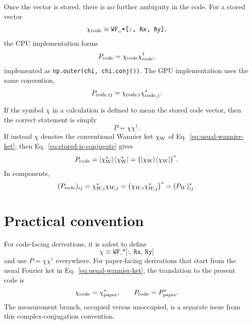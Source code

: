 \documentclass[aps,prb,onecolumn,nofootinbib,superscriptaddress]{revtex4-2}
\newcommand{\chiC}{\chi_{\rm code}}
\newcommand{\chiW}{\chi_{\rm W}}
\begin{document}
Once the vector is stored, there is no further ambiguity in the code.  For a
stored vector
\begin{equation}
    \chiC \equiv \texttt{WF\_*[:, Rx, Ry]},
\end{equation}
the CPU implementation forms
\begin{equation}
    P_{\rm code}
    =
    \chiC\chiC^\dagger ,
    \label{eq:code-projector}
\end{equation}
implemented as \texttt{np.outer(chi, chi.conj())}.  The GPU implementation uses
the same convention,
\begin{equation}
    P_{{\rm code},ij}
    =
    \chi_{{\rm code},i}\chi_{{\rm code},j}^* .
\end{equation}

If the symbol $\chi$ in a calculation is defined to mean the stored code vector,
then the correct statement is simply
\begin{equation}
    P = \chi\chi^\dagger .
\end{equation}
If instead $\chi$ denotes the conventional Wannier ket
$\chiW$ of Eq.~\eqref{eq:usual-wannier-ket}, then
Eq.~\eqref{eq:stored-is-conjugate} gives
\begin{equation}
    P_{\rm code}
    =
    |\chiW^*\rangle\langle \chiW^*|
    =
    \bigl(|\chiW\rangle\langle\chiW|\bigr)^* .
    \label{eq:projector-conjugate}
\end{equation}
In components,
\begin{equation}
    (P_{\rm code})_{ij}
    =
    \chi_{W,i}^*\chi_{W,j}
    =
    \left(\chi_{W,i}\chi_{W,j}^*\right)^*
    =
    (P_W)_{ij}^* .
\end{equation}

\section{Practical convention}

For code-facing derivations, it is safest to define
\begin{equation}
    \chi \equiv \texttt{WF\_*[:, Rx, Ry]}
\end{equation}
and use $P=\chi\chi^\dagger$ everywhere.  For paper-facing derivations that
start from the usual Fourier ket in Eq.~\eqref{eq:usual-wannier-ket}, the
translation to the present code is
\begin{equation}
    \chi_{\rm code}=\chi_{\rm paper}^*,\qquad
    P_{\rm code}=P_{\rm paper}^* .
\end{equation}
The measurement branch, occupied versus unoccupied, is a separate issue from
this complex-conjugation convention.
\end{document}
